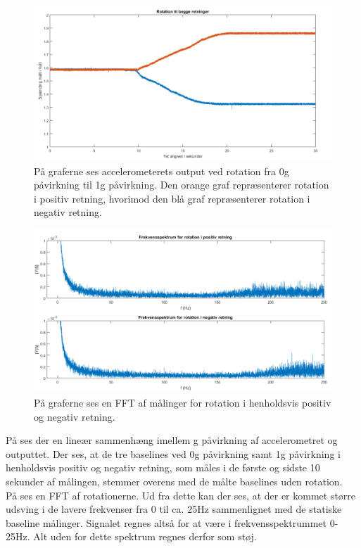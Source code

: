\begin{figure}[H]
	\centering
	\includegraphics[scale=0.45]{figures/cProblemloesning/Pilotforsoeg_Rotation.png}
	\caption{På graferne ses accelerometerets output ved rotation fra 0g påvirkning til 1g påvirkning. Den orange graf repræsenterer rotation i positiv retning, hvorimod den blå graf repræsenterer rotation i negativ retning.}
	\label{Fig:Pilot_Rottid}
\end{figure}
\begin{figure}[H]
	\centering
	\includegraphics[scale=0.5]{figures/cProblemloesning/Pilotforsoeg_RotationFrekvens.png}
	\caption{På graferne ses en FFT af målinger for rotation i henholdsvis positiv og negativ retning.}
	\label{Fig:Pilot_Rotfrek}
\end{figure}
På  ses der en lineær sammenhæng imellem g påvirkning af accelerometret og outputtet. Der ses, at de tre baselines ved 0g påvirkning samt 1g påvirkning i henholdsvis positiv og negativ retning, som måles i de første og sidste 10 sekunder af målingen, stemmer overens med de målte baselines uden rotation. \\
På  ses en FFT af rotationerne. Ud fra dette kan der ses, at der er kommet større udsving i de lavere frekvenser fra 0 til ca. 25Hz sammenlignet med de statiske baseline målinger. Signalet regnes altså for at være i frekvensspektrummet 0-25Hz. Alt uden for dette spektrum regnes derfor som støj.


